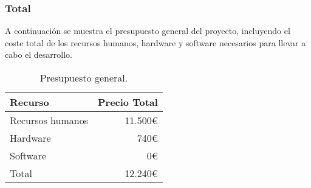 \subsubsection{Total}
A continuación se muestra el presupuesto general del proyecto, incluyendo el
coste total de los recursos humanos, hardware y software necesarios para llevar
a cabo el desarrollo.

\begin{table}
    \centering
    \begin{tabular}[H]{l|r}
        \textbf{Recurso} & \textbf{Precio Total} \\
        \hline
        Recursos humanos & 11.500\euro           \\
        Hardware         & 740\euro              \\
        Software         & 0\euro                \\
        \hline
        Total            & 12.240\euro           \\
    \end{tabular}
    \caption{Presupuesto general.}
    \label{tab:total-budget}
\end{table}

\break


\pagebreak